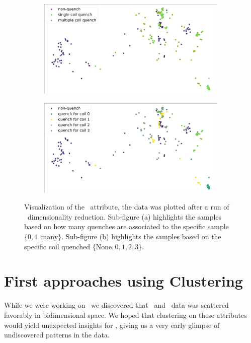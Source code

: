\begin{figure}[!ht]
	\centering
	\begin{subfigure}{0.8\linewidth}
		\centering
		\includegraphics[width=\linewidth]{img/quench_dist_qlp/single_vs_multiple_Phi.png}
		\subcaption{}
	\end{subfigure}
	\begin{subfigure}{0.8\linewidth}
		\centering
		\includegraphics[width=\linewidth]{img/quench_dist_qlp_phi.png}
		\subcaption{}
	\end{subfigure}
	\caption{Visualization of the \phin\ attribute, the data was plotted after a run of \pca\
		dimensionality reduction. Sub-figure (a) highlights the samples based on how many quenches
		are associated to the specific sample $\{0, 1, \text{many}\}$. Sub-figure (b) highlights the
		samples based on the specific coil quenched $\{\text{None}, 0, 1, 2, 3\}$.}
	\label{fig:phi-coilq-dist}
\end{figure}

\section{First approaches using Clustering}
\label{sec:qlp-cluster}
While we were working on \qrp\ we discovered that \an\ and \cnmod\ data was scattered favorably in
bidimensional space. We hoped that clustering on these attributes would yield unexpected insights
for \qlp, giving us a very early glimpse of undiscovered patterns in the data.

